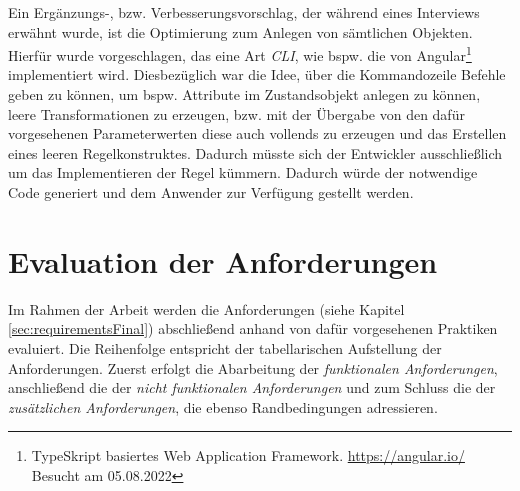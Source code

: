         Ein Ergänzungs-, bzw. Verbesserungsvorschlag, der während eines Interviews erwähnt wurde, ist die Optimierung zum Anlegen von sämtlichen Objekten. 
        Hierfür wurde vorgeschlagen, das eine Art \textit{\ac{CLI}}, wie bspw. die von Angular\footnote{TypeSkript basiertes Web Application Framework. \url{https://angular.io/} Besucht am 05.08.2022} 
        implementiert wird. Diesbezüglich war die Idee, über die Kommandozeile Befehle geben zu können, um bspw. Attribute im Zustandsobjekt anlegen zu können, leere Transformationen zu erzeugen, bzw. mit der 
        Übergabe von den dafür vorgesehenen Parameterwerten diese auch vollends zu erzeugen und das Erstellen eines leeren Regelkonstruktes. Dadurch müsste sich der Entwickler 
        ausschließlich um das Implementieren der Regel kümmern. Dadurch würde der notwendige Code generiert und dem Anwender zur Verfügung gestellt werden.
        
\section{Evaluation der Anforderungen}
    Im Rahmen der Arbeit werden die Anforderungen (siehe Kapitel \ref{sec:requirementsFinal}) abschließend anhand von dafür vorgesehenen Praktiken evaluiert. 
    Die Reihenfolge entspricht der tabellarischen Aufstellung der Anforderungen. Zuerst erfolgt die Abarbeitung der \textit{funktionalen Anforderungen}, 
    anschließend die der \textit{nicht funktionalen Anforderungen} und zum Schluss die der \textit{zusätzlichen Anforderungen}, die ebenso Randbedingungen adressieren.
    
